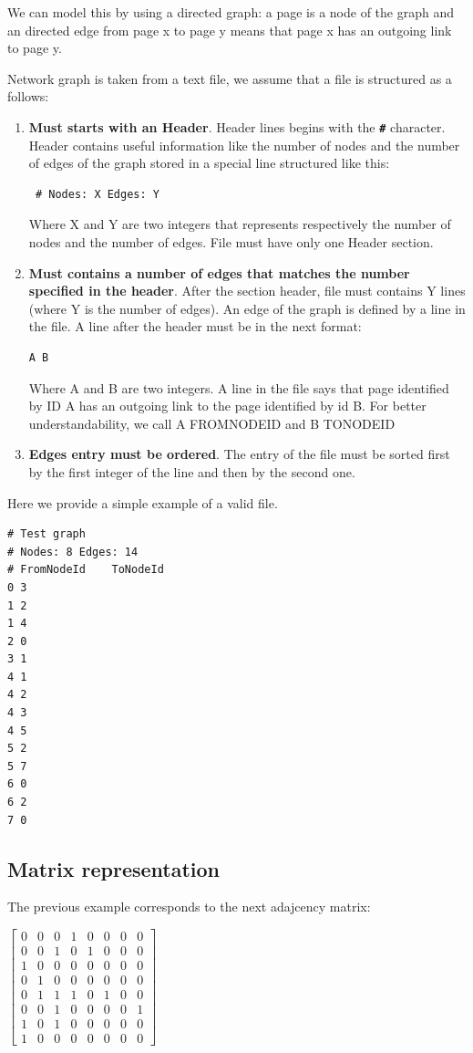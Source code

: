 \documentclass[10pt]{article}
\begin{document}
We can model this by using a directed graph: a page is a node of the graph and an directed edge from page x to page y means that page x has an outgoing link to page y.

Network graph is taken from a text file, we assume that a file is structured as a follows:

\begin{enumerate}
    \item {\bf Must starts with an Header}. Header lines begins with the {\bf \texttt{\#}} character. Header contains useful information like the number of nodes and the number of edges of the graph stored in a special line structured like this:
    \begin{verbatim} # Nodes: X Edges: Y \end{verbatim}
    Where X and Y are two integers that represents respectively the number of nodes and the number of edges.
    File must have only one Header section.
    \item {\bf Must contains a number of edges that matches the number specified in the header}. After the section header, file must contains Y lines (where Y is the number of edges). An edge of the graph is defined by a line in the file. A line after the header must be in the next format:
    \begin{verbatim}A B\end{verbatim}
    Where A and B are two integers. A line in the file says that page identified by ID A has an outgoing link to the page identified by id B. 
    For better understandability, we call A FROMNODEID and B TONODEID
    \item {\bf Edges entry must be ordered}. The entry of the file must be sorted first by the first integer of the line and then by the second one.
\end{enumerate}
Here we provide a simple example of a valid file.
\begin{verbatim}
# Test graph
# Nodes: 8 Edges: 14
# FromNodeId	ToNodeId
0 3
1 2
1 4
2 0
3 1
4 1
4 2
4 3
4 5
5 2
5 7
6 0
6 2
7 0
\end{verbatim}
\subsection{Matrix representation}
The previous example corresponds to the next adajcency matrix:

$ \begin{bmatrix}
    0 & 0 & 0 & 1 & 0 & 0 & 0 & 0 \\
    0 & 0 & 1 & 0 & 1 & 0 & 0 & 0 \\
    1 & 0 & 0 & 0 & 0 & 0 & 0 & 0 \\
    0 & 1 & 0 & 0 & 0 & 0 & 0 & 0 \\
    0 & 1 & 1 & 1 & 0 & 1 & 0 & 0 \\
    0 & 0 & 1 & 0 & 0 & 0 & 0 & 1 \\
    1 & 0 & 1 & 0 & 0 & 0 & 0 & 0 \\
    1 & 0 & 0 & 0 & 0 & 0 & 0 & 0 
    \end{bmatrix}  $
\end{document}

